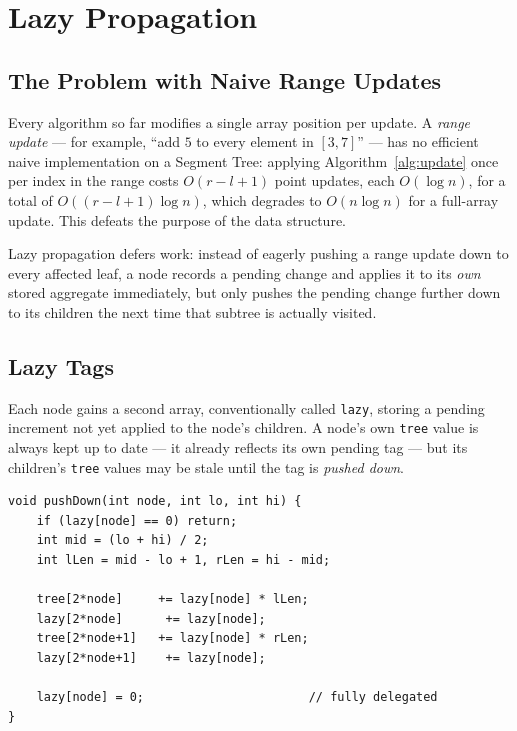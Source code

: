 \documentclass[
  11pt,
  a4paper,
  twoside=false,
  numbers=noenddot,
  headings=big,
  parskip=half,
  toc=bibliography,
  toc=listof,
  bibliography=totoc
]{scrreprt}
\newcounter{example}[chapter]
\newcommand{\Oh}[1]{O\!\left(#1\right)}
\begin{document}
\chapter{Lazy Propagation}
\label{ch:lazy}

\section{The Problem with Naive Range Updates}
Every algorithm so far modifies a single array position per update. A \emph{range update} --- for example, ``add $5$ to every element in $[3,7]$'' --- has no efficient naive implementation on a Segment Tree: applying Algorithm~\ref{alg:update} once per index in the range costs $\Oh{r-l+1}$ point updates, each $\Oh{\log n}$, for a total of $\Oh{(r-l+1)\log n}$, which degrades to $\Oh{n\log n}$ for a full-array update. This defeats the purpose of the data structure.

\begin{keyidea}
Lazy propagation defers work: instead of eagerly pushing a range update down to every affected leaf, a node records a pending change and applies it to its \emph{own} stored aggregate immediately, but only pushes the pending change further down to its children the next time that subtree is actually visited.
\end{keyidea}

\section{Lazy Tags}
Each node gains a second array, conventionally called \texttt{lazy}, storing a pending increment not yet applied to the node's children. A node's own \texttt{tree} value is always kept up to date --- it already reflects its own pending tag --- but its children's \texttt{tree} values may be stale until the tag is \emph{pushed down}.

\begin{lstlisting}[style=cpp, caption={Pushing a pending tag down to both children before recursing into either one.}, label={alg:pushdown}]
void pushDown(int node, int lo, int hi) {
    if (lazy[node] == 0) return;
    int mid = (lo + hi) / 2;
    int lLen = mid - lo + 1, rLen = hi - mid;

    tree[2*node]     += lazy[node] * lLen;
    lazy[2*node]      += lazy[node];
    tree[2*node+1]   += lazy[node] * rLen;
    lazy[2*node+1]    += lazy[node];

    lazy[node] = 0;                       // fully delegated
}
\end{lstlisting}
\end{document}
